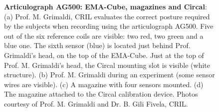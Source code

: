 \begin{figure}
	\centering
		\hspace{0.05\textwidth}

		\hspace{0.05\textwidth}

	\caption[Articulograph AG500]{\textbf{Articulograph AG500: EMA-Cube, magazines and Circal}:
	(a) Prof. M. Grimaldi, CRIL evaluates the correct posture required by the
	subjects when recording using the articulograph AG500.
	Five out of the six reference coils are visible: two red, two green and a
	blue one. The sixth sensor (blue) is located just behind Prof. Grimaldi's
	head, on the top of the EMA-Cube.
	Just at the top of Prof. M. Grimaldi's head, the Circal mounting slot is
	visible (white structure).
	(b) Prof. M. Grimaldi during an experiment (some sensor wires are visible).
	(c) A magazine with four sensors mounted. 
	(d) The magazine attached to the Circal calibration device.
	Photos courtesy of Prof. M. Grimaldi and Dr. B. Gili Fivela, CRIL.}
	\label{fig:linguometer:ag:intro}
\end{figure}
